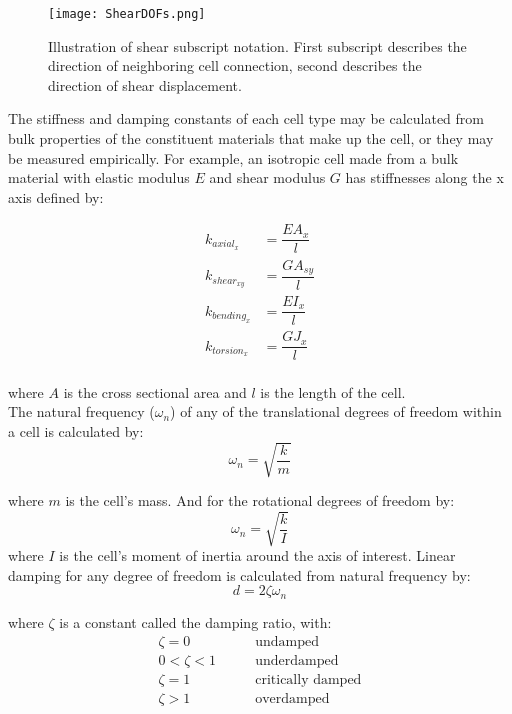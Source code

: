 {\begin{figure}
  \texttt{[image: ShearDOFs.png]}
  \caption{Illustration of shear subscript notation.  First subscript describes the direction of neighboring cell connection, second describes the direction of shear displacement.}
  \label{fig:ShearDOFs}
\end{figure}

The stiffness and damping constants of each cell type may be calculated from bulk properties of the constituent materials that make up the cell, or they may be measured empirically.  For example, an isotropic cell made from a bulk material with elastic modulus $E$ and shear modulus $G$ has stiffnesses along the x axis defined by:

\begin{subequations}
\begin{align} 
\label{eq:kaxial}
k_{axial_x} &= \dfrac{EA_x}{l}\\[10pt]
\label{eq:kshear}
k_{shear_{xy}} &= \dfrac{GA_{sy}}{l}\\[10pt]
\label{eq:kbending}
k_{bending_x} &= \dfrac{EI_x}{l}\\[10pt]
\label{eq:ktorsion}
k_{torsion_x} &= \dfrac{GJ_x}{l}
\end{align}
\end{subequations}
\\
where $A$ is the cross sectional area and $l$ is the length of the cell.\\

The natural frequency ($\omega_n$) of any of the translational degrees of freedom within a cell is calculated by:
\begin{equation}\label{eq:natFreq}
 \omega_n = \sqrt{\dfrac{k}{m}}
 \end{equation}

where $m$ is the cell's mass.  And for the rotational degrees of freedom by:
\begin{equation}\label{eq:natFreqRot}
 \omega_n = \sqrt{\dfrac{k}{I}}
 \end{equation}
 where $I$ is the cell's moment of inertia around the axis of interest.  Linear damping for any degree of freedom is calculated from natural frequency by:
\[ d = 2\zeta \omega_n \]

where $\zeta$ is a constant called the damping ratio, with:
\begin{subequations}
\begin{align*}
\zeta = 0 \qquad &\text{undamped}\\
0 < \zeta < 1 \qquad &\text{underdamped}\\
\zeta = 1 \qquad &\text{critically damped}\\
\zeta > 1 \qquad &\text{overdamped}\\
\end{align*}
\end{subequations}

}
